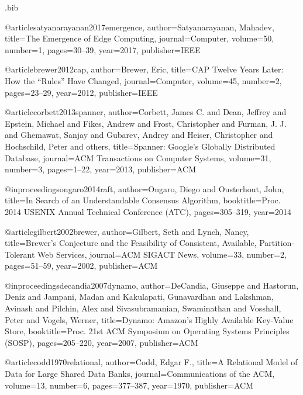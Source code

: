 \begin{filecontents*}{\jobname.bib}

@article{satyanarayanan2017emergence,
  author={Satyanarayanan, Mahadev},
  title={The Emergence of Edge Computing},
  journal={Computer},
  volume={50},
  number={1},
  pages={30--39},
  year={2017},
  publisher={IEEE}
}

@article{brewer2012cap,
  author={Brewer, Eric},
  title={{CAP} Twelve Years Later: How the ``Rules'' Have Changed},
  journal={Computer},
  volume={45},
  number={2},
  pages={23--29},
  year={2012},
  publisher={IEEE}
}

@article{corbett2013spanner,
  author={Corbett, James C. and Dean, Jeffrey and Epstein, Michael and Fikes, Andrew and Frost, Christopher and Furman, J. J. and Ghemawat, Sanjay and Gubarev, Andrey and Heiser, Christopher and Hochschild, Peter and others},
  title={Spanner: {Google}'s Globally Distributed Database},
  journal={ACM Transactions on Computer Systems},
  volume={31},
  number={3},
  pages={1--22},
  year={2013},
  publisher={ACM}
}

@inproceedings{ongaro2014raft,
  author={Ongaro, Diego and Ousterhout, John},
  title={In Search of an Understandable Consensus Algorithm},
  booktitle={Proc. 2014 USENIX Annual Technical Conference (ATC)},
  pages={305--319},
  year={2014}
}

@article{gilbert2002brewer,
  author={Gilbert, Seth and Lynch, Nancy},
  title={Brewer's Conjecture and the Feasibility of Consistent, Available, Partition-Tolerant Web Services},
  journal={ACM SIGACT News},
  volume={33},
  number={2},
  pages={51--59},
  year={2002},
  publisher={ACM}
}

@inproceedings{decandia2007dynamo,
  author={DeCandia, Giuseppe and Hastorun, Deniz and Jampani, Madan and Kakulapati, Gunavardhan and Lakshman, Avinash and Pilchin, Alex and Sivasubramanian, Swaminathan and Vosshall, Peter and Vogels, Werner},
  title={Dynamo: {Amazon}'s Highly Available Key-Value Store},
  booktitle={Proc. 21st ACM Symposium on Operating Systems Principles (SOSP)},
  pages={205--220},
  year={2007},
  publisher={ACM}
}

@article{codd1970relational,
  author={Codd, Edgar F.},
  title={A Relational Model of Data for Large Shared Data Banks},
  journal={Communications of the ACM},
  volume={13},
  number={6},
  pages={377--387},
  year={1970},
  publisher={ACM}
}


\end{filecontents*}
